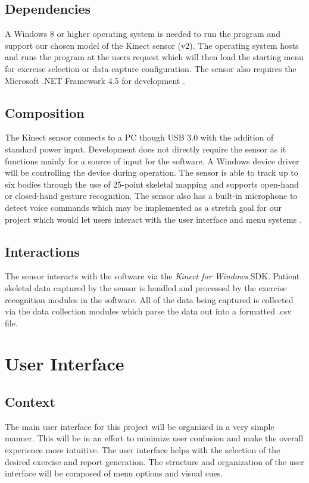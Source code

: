 \documentclass[onecolumn, draftclsnofoot,10pt, compsoc]{IEEEtran}
\begin{document}
\subsection{Dependencies}
A Windows 8 or higher operating system is needed to run the program and support our chosen model of the Kinect sensor (v2). The operating system hosts and runs the program at the users request which will then load the starting menu for exercise selection or data capture configuration. The sensor also requires the Microsoft .NET Framework 4.5 for development \cite{KinectDevelop}. 

\subsection{Composition}
The Kinect sensor connects to a PC though USB 3.0 with the addition of standard power input. Development does not directly require the sensor as it functions mainly for a source of input for the software. A Windows device driver will be controlling the device during operation. The sensor is able to track up to six bodies through the use of 25-point skeletal mapping and supports open-hand or closed-hand gesture recognition. The sensor also has a built-in microphone to detect voice commands which may be implemented as a stretch goal for our project which would let users interact with the user interface and menu systems \cite{KinectConstraints}. 

\subsection{Interactions}
The sensor interacts with the software via the \textit{Kinect for Windows} SDK. Patient skeletal data captured by the sensor is handled and processed by the exercise recognition modules in the software. All of the data being captured is collected via the data collection modules which parse the data out into a formatted .csv file. 

\section{User Interface}
\subsection{Context}
The main user interface for this project will be organized in a very simple manner. This will be in an effort to minimize user confusion and make the overall experience more intuitive. The user interface helps with the selection of the desired exercise and report generation. The structure and organization of the user interface will be composed of menu options and visual cues. 
\end{document}
